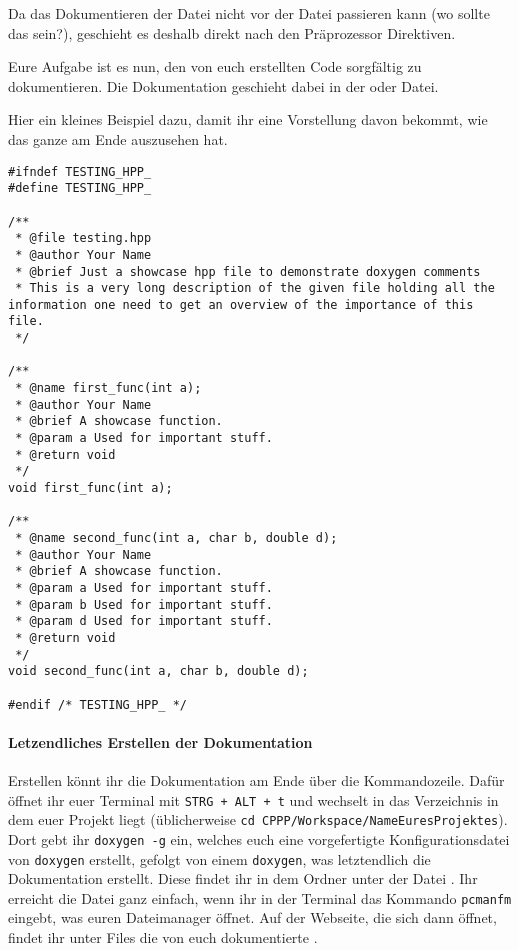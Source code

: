 Da das Dokumentieren der Datei nicht vor der Datei passieren kann (wo sollte das sein?), geschieht es deshalb direkt nach den Präprozessor Direktiven.

Eure Aufgabe ist es nun, den von euch erstellten Code sorgfältig zu dokumentieren.
Die Dokumentation geschieht dabei in der  oder  Datei.

Hier ein kleines Beispiel dazu, damit ihr eine Vorstellung davon bekommt, wie das ganze am Ende auszusehen hat.

\begin{lstlisting}
#ifndef TESTING_HPP_
#define TESTING_HPP_

/**
 * @file testing.hpp
 * @author Your Name
 * @brief Just a showcase hpp file to demonstrate doxygen comments
 * This is a very long description of the given file holding all the information one need to get an overview of the importance of this file.
 */

/**
 * @name first_func(int a);
 * @author Your Name
 * @brief A showcase function.
 * @param a Used for important stuff.
 * @return void
 */
void first_func(int a);

/**
 * @name second_func(int a, char b, double d);
 * @author Your Name
 * @brief A showcase function.
 * @param a Used for important stuff.
 * @param b Used for important stuff.
 * @param d Used for important stuff.
 * @return void
 */
void second_func(int a, char b, double d);

#endif /* TESTING_HPP_ */
\end{lstlisting}

\paragraph{Letzendliches Erstellen der Dokumentation}
Erstellen könnt ihr die Dokumentation am Ende über die Kommandozeile.
Dafür öffnet ihr euer Terminal mit \lstinline{STRG + ALT + t} und wechselt in das Verzeichnis in dem euer Projekt liegt (üblicherweise \lstinline{cd CPPP/Workspace/NameEuresProjektes}).
Dort gebt ihr \lstinline{doxygen -g} ein, welches euch eine vorgefertigte Konfigurationsdatei  von \texttt{doxygen} erstellt, gefolgt von einem \lstinline{doxygen}, was letztendlich die Dokumentation erstellt.
Diese findet ihr in dem Ordner  unter der Datei .
Ihr erreicht die Datei ganz einfach, wenn ihr in der Terminal das Kommando \lstinline{pcmanfm} eingebt, was euren Dateimanager öffnet.
Auf der Webseite, die sich dann öffnet, findet ihr unter Files die von euch dokumentierte .

